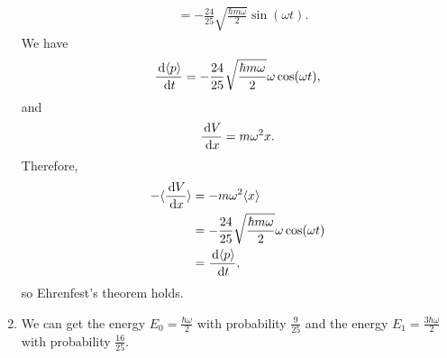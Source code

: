 \documentclass[en, oneside]{vivi}
\begin{document}
\begin{sol}
\begin{enumerate}[label=(\alph*)]
\begin{align*}
            &= -\frac{24}{25} \sqrt{\frac{\hbar m \omega}{2}} \sin(\omega t).
        \end{align*}
        We have
        \begin{equation*}
            \frac{\dif \langle p \rangle}{\dif t} = -\frac{24}{25} \sqrt{\frac{\hbar m \omega}{2}} \omega \cos(\omega t),
        \end{equation*}
        and
        \begin{equation*}
            \frac{\dif V}{\dif x} = m \omega^2 x.
        \end{equation*}
        Therefore,
        \begin{align*}
            - \langle \frac{\dif V}{\dif x} \rangle &= - m \omega^2 \langle x \rangle\\
            &= - \frac{24}{25} \sqrt{\frac{\hbar m \omega}{2}} \omega \cos(\omega t)\\
            &= \frac{\dif \langle p \rangle}{\dif t},
        \end{align*}
        so Ehrenfest's theorem holds.
        \item We can get the energy $E_0 = \frac{\hbar \omega}{2}$ with probability $\frac{9}{25}$ and the energy $E_1 = \frac{3\hbar \omega}{2}$ with probability $\frac{16}{25}$.
    \end{enumerate}
\end{sol}
\end{document}
